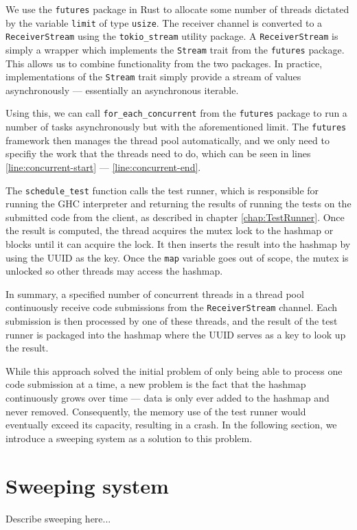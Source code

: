 We use the \texttt{futures} package in Rust to allocate some number of threads dictated by the variable \texttt{limit} of type \texttt{usize}.
The receiver channel is converted to a \texttt{ReceiverStream} using the \texttt{tokio\_stream} utility package.
A \texttt{ReceiverStream} is simply a wrapper which implements the \texttt{Stream} trait from the \texttt{futures} package.
This allows us to combine functionality from the two packages.
In practice, implementations of the \texttt{Stream} trait simply provide a stream of values asynchronously --- essentially an asynchronous iterable.

Using this, we can call \texttt{for\_each\_concurrent} from the \texttt{futures} package to run a number of tasks asynchronously but with the aforementioned limit. 
The \texttt{futures} framework then manages the thread pool automatically, and we only need to specifiy the work that the threads need to do, which can be seen in lines \ref{line:concurrent-start} --- \ref{line:concurrent-end}.

The \texttt{schedule\_test} function calls the test runner, which is responsible for running the GHC interpreter and returning the results of running the tests on the submitted code from the client, as described in chapter \ref{chap:TestRunner}.
Once the result is computed, the thread acquires the mutex lock to the hashmap or blocks until it can acquire the lock.
It then inserts the result into the hashmap by using the UUID as the key.
Once the \texttt{map} variable goes out of scope, the mutex is unlocked so other threads may access the hashmap.

In summary, a specified number of concurrent threads in a thread pool continuously receive code submissions from the \texttt{ReceiverStream} channel.
Each submission is then processed by one of these threads, and the result of the test runner is packaged into the hashmap where the UUID serves as a key to look up the result.

While this approach solved the initial problem of only being able to process one code submission at a time, a new problem is the fact that the hashmap continuously grows over time --- data is only ever added to the hashmap and never removed.
Consequently, the memory use of the test runner would eventually exceed its capacity, resulting in a crash.
In the following section, we introduce a sweeping system as a solution to this problem.

\section{Sweeping system}
Describe sweeping here...

